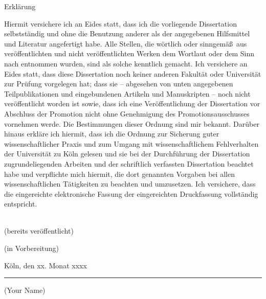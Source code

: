 \cleardoublepage
\thispagestyle{empty}

\begin{center}
{\color{accentcolor2} \mainregular \Huge Erkl\"arung} 
\end{center}
\vspace{1cm}

\noindent Hiermit versichere ich an Eides statt, dass ich die vorliegende Dissertation selbstst\"andig und ohne die Benutzung anderer als der angegebenen Hilfsmittel und Literatur angefertigt habe. Alle Stellen, die w\"ortlich oder sinngem\"a\ss~aus ver\"offentlichten und nicht ver\"offentlichten Werken dem Wortlaut oder dem Sinn nach entnommen wurden, sind als solche kenntlich gemacht. Ich versichere an Eides statt, dass diese Dissertation noch keiner anderen Fakult\"at oder Universit\"at zur Pr\"ufung vorgelegen hat; dass sie -- abgesehen von unten angegebenen Teilpublikationen und eingebundenen Artikeln und Manuskripten -- noch nicht ver\"offentlicht worden ist sowie, dass ich eine Ver\"offentlichung der Dissertation vor Abschluss der Promotion nicht ohne Genehmigung des Promotionsausschusses vornehmen werde. Die Bestimmungen dieser Ordnung sind mir bekannt. Dar\"uber hinaus erkl\"are ich hiermit, dass ich die Ordnung zur Sicherung guter wissenschaftlicher Praxis und zum Umgang mit wissenschaftlichem Fehlverhalten der Universit\"at zu K\"oln gelesen und sie bei der Durchf\"uhrung der Dissertation zugrundeliegenden Arbeiten und der schriftlich verfassten Dissertation beachtet habe und verpflichte mich hiermit, die dort genannten Vorgaben bei allen wissenschaftlichen T\"atigkeiten zu beachten und umzusetzen. Ich versichere, dass die eingereichte elektronische Fassung der eingereichten Druckfassung vollst\"andig entspricht.
\vspace{0.5cm}

\begin{center}
 \\
(bereits ver\"offentlicht)
\end{center}

\newrefcontext[labelprefix=P]
\printbibliography[category=own,heading=none]

\begin{center}
(in Vorbereitung)
\end{center}

\newrefcontext[labelprefix=U]
\printbibliography[category=prep,heading=none]

\vspace{1.5cm}

\noindent K\"oln, den xx. Monat xxxx \hfill
\begin{minipage}[t]{4.5cm}\begin{center}
	\rule[-1pt]{4cm}{.4pt}\vskip -5pt
	{\scriptsize (Your Name)}
\end{center}
\end{minipage}
